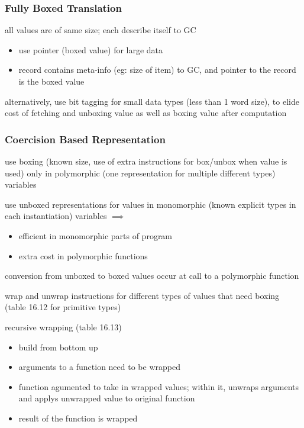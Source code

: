 \documentclass[8pt]{extarticle}
\begin{document}
\begin{multicols*}{2}
  \subsubsection{Fully Boxed Translation}
  all values are of same size; each describe itself to GC

  \begin{itemize}
  \item use pointer (boxed value) for large data
  \item record contains meta-info (eg: size of item) to GC, and pointer to the record is the boxed value
  \end{itemize}

  alternatively, use bit tagging for small data types (less than 1 word size), to elide cost of fetching and unboxing value as well as boxing value after computation

  \subsubsection{Coercision Based Representation}

  use boxing (known size, use of extra instructions for box/unbox when value is used) only in polymorphic (one representation for multiple different types) variables

  use unboxed representations for values in monomorphic (known explicit types in each instantiation) variables $\implies$
  \begin{itemize}
  \item efficient in monomorphic parts of program
  \item extra cost in polymorphic functions
  \end{itemize}

  conversion from unboxed to boxed values occur at call to a polymorphic function

  wrap and unwrap instructions for different types of values that need boxing (table 16.12 for primitive types)

  recursive wrapping (table 16.13)
  \begin{itemize}
  \item build from bottom up
  \item arguments to a function need to be wrapped
  \item function agumented to take in wrapped values; within it, unwraps arguments and applys unwrapped value to original function
  \item result of the function is wrapped
  \end{itemize}


\end{multicols*}
\end{document}
